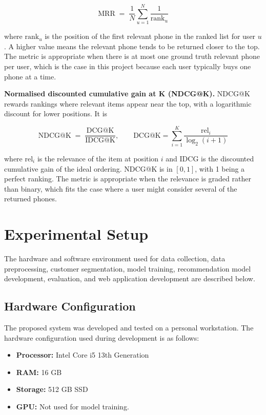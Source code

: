 \documentclass[12pt]{report}
\numberwithin{figure}{chapter}
\numberwithin{table}{chapter}
\numberwithin{equation}{chapter}
\begin{document}
\begin{equation}
\text{MRR} \;=\; \frac{1}{N} \sum_{u=1}^{N} \frac{1}{\text{rank}_u}
\label{eq:mrr}
\end{equation}

\noindent where $\text{rank}_u$ is the position of the first relevant phone in the ranked list for user $u$. A higher value means the relevant phone tends to be returned closer to the top. The metric is appropriate when there is at most one ground truth relevant phone per user, which is the case in this project because each user typically buys one phone at a time.

\textbf{Normalised discounted cumulative gain at K (NDCG@K).} NDCG@K rewards rankings where relevant items appear near the top, with a logarithmic discount for lower positions. It is

\begin{equation}
\text{NDCG@K} \;=\; \frac{\text{DCG@K}}{\text{IDCG@K}}, \qquad \text{DCG@K} = \sum_{i=1}^{K} \frac{\text{rel}_i}{\log_2(i + 1)}
\label{eq:ndcg}
\end{equation}

\noindent where $\text{rel}_i$ is the relevance of the item at position $i$ and IDCG is the discounted cumulative gain of the ideal ordering. NDCG@K is in $[0, 1]$, with 1 being a perfect ranking. The metric is appropriate when the relevance is graded rather than binary, which fits the case where a user might consider several of the returned phones.

\chapter{Experimental Setup}
The hardware and software environment used for data collection, data preprocessing, customer segmentation, model training, recommendation model development, evaluation, and web application development are described below.

\section{Hardware Configuration}

The proposed system was developed and tested on a personal workstation. The hardware configuration used during development is as follows:

\begin{itemize}
    \item \textbf{Processor:} Intel Core i5 13th Generation
    \item \textbf{RAM:} 16 GB
    \item \textbf{Storage:} 512 GB SSD
    \item \textbf{GPU:} Not used for model training.
\end{itemize}
\end{document}
